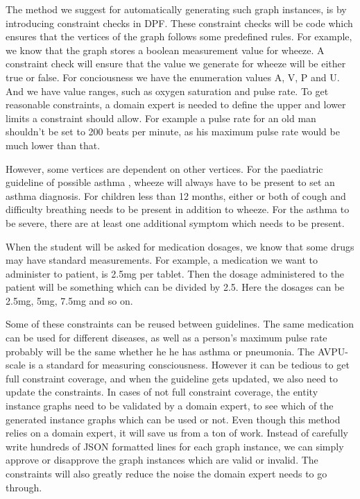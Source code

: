 The method we suggest for automatically generating such graph instances, is by introducing constraint checks in DPF. These constraint checks will be code which ensures that the vertices of the graph follows some predefined rules. For example, we know that the graph stores a boolean measurement value for wheeze. A constraint check will ensure that the value we generate for wheeze will be either true or false. For conciousness we have the enumeration values A, V, P and U. And we have value ranges, such as oxygen saturation and pulse rate. To get reasonable  constraints, a domain expert is needed to define the upper and lower limits a constraint should allow. For example a pulse rate for an old man shouldn't be set to 200 beats per minute, as his maximum pulse rate would be much lower than that.

However, some vertices are dependent on other vertices. For the paediatric guideline of possible asthma \parencite{RepublicofKeny2016}, wheeze will always have to be present to set an asthma diagnosis. For children less than 12 months, either or both of cough and difficulty breathing needs to be present in addition to wheeze. For the asthma to be severe, there are at least one additional symptom which needs to be present.

When the student will be asked for medication dosages, we know that some drugs may have standard measurements. For example, a medication we want to administer to patient, is 2.5mg per tablet. Then the dosage administered to the patient will be something which can be divided by 2.5. Here the dosages can be 2.5mg, 5mg, 7.5mg and so on.

Some of these constraints can be reused between guidelines. The same medication can be used for different diseases, as well as a person's maximum pulse rate probably will be the same whether he he has asthma or pneumonia. The AVPU-scale is a standard for measuring consciousness. However it can be tedious to get full constraint coverage, and when the guideline gets updated, we also need to update the constraints. In cases of not full constraint coverage, the entity instance graphs need to be validated by a domain expert, to see which of the generated instance graphs which can be used or not.  Even though this method relies on a domain expert, it will save us from a ton of work. Instead of carefully write hundreds of JSON formatted lines for each graph instance, we can simply approve or disapprove the graph instances which are valid or invalid. The constraints will also greatly reduce the noise the domain expert needs to go through. 



